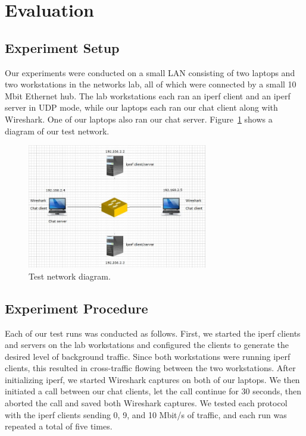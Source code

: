 
\section{Evaluation}

\subsection{Experiment Setup}

Our experiments were conducted on a small LAN consisting of two laptops and two
workstations in the networks lab, all of which were connected by a small 10 Mbit
Ethernet hub. The lab workstations each ran an iperf client and an iperf server
in UDP mode, while our laptops each ran our chat client along with Wireshark.
One of our laptops also ran our chat server. Figure~\ref{fig:test_network} shows a
diagram of our test network.

\begin{figure}[!t]
   \centering
      \includegraphics[width=0.7\textwidth]{pics/network_diagram}
   \caption{Test network diagram.}
\label{fig:test_network}
\end{figure}

\subsection{Experiment Procedure}

Each of our test runs was conducted as follows. First, we started the iperf
clients and servers on the lab workstations and configured the clients to
generate the desired level of background traffic. Since both workstations were
running iperf clients, this resulted in cross-traffic flowing between the two
workstations. After initializing iperf, we started Wireshark captures on both of
our laptops. We then initiated a call between our chat clients, let the call
continue for 30 seconds, then aborted the call and saved both Wireshark captures. We
tested each protocol with the iperf clients sending 0, 9, and 10 Mbit/s of
traffic, and each run was repeated a total of five times.

